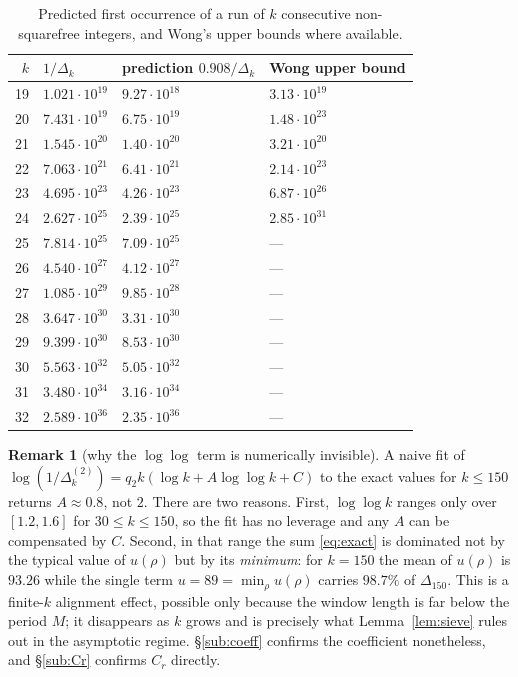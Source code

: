 \documentclass[11pt,reqno]{amsart}
\theoremstyle{plain}
\theoremstyle{definition}
\newtheorem{remark}[theorem]{Remark}
\numberwithin{equation}{section}
\begin{document}
\begin{table}[ht]
\caption{Predicted first occurrence of a run of $k$ consecutive non-squarefree integers,
and Wong's upper bounds where available.}
\label{tab:pred}
\begin{tabular}{rlll}
\toprule
$k$ & $1/\Delta_k$ & prediction $0.908/\Delta_k$ & Wong upper bound\\
\midrule
19 & $1.021\cdot10^{19}$ & $9.27\cdot10^{18}$ & $3.13\cdot10^{19}$\\
20 & $7.431\cdot10^{19}$ & $6.75\cdot10^{19}$ & $1.48\cdot10^{23}$\\
21 & $1.545\cdot10^{20}$ & $1.40\cdot10^{20}$ & $3.21\cdot10^{20}$\\
22 & $7.063\cdot10^{21}$ & $6.41\cdot10^{21}$ & $2.14\cdot10^{23}$\\
23 & $4.695\cdot10^{23}$ & $4.26\cdot10^{23}$ & $6.87\cdot10^{26}$\\
24 & $2.627\cdot10^{25}$ & $2.39\cdot10^{25}$ & $2.85\cdot10^{31}$\\
25 & $7.814\cdot10^{25}$ & $7.09\cdot10^{25}$ & ---\\
26 & $4.540\cdot10^{27}$ & $4.12\cdot10^{27}$ & ---\\
27 & $1.085\cdot10^{29}$ & $9.85\cdot10^{28}$ & ---\\
28 & $3.647\cdot10^{30}$ & $3.31\cdot10^{30}$ & ---\\
29 & $9.399\cdot10^{30}$ & $8.53\cdot10^{30}$ & ---\\
30 & $5.563\cdot10^{32}$ & $5.05\cdot10^{32}$ & ---\\
31 & $3.480\cdot10^{34}$ & $3.16\cdot10^{34}$ & ---\\
32 & $2.589\cdot10^{36}$ & $2.35\cdot10^{36}$ & ---\\
\bottomrule
\end{tabular}
\end{table}

\begin{remark}[why the $\log\log$ term is numerically invisible]\label{rem:slow}
A naive fit of $\log(1/\Delta^{(2)}_k)=q_2k(\log k+A\log\log k+C)$ to the exact values for
$k\le150$ returns $A\approx0.8$, not $2$. There are two reasons. First, $\log\log k$ ranges
only over $[1.2,1.6]$ for $30\le k\le150$, so the fit has no leverage and any $A$ can be
compensated by $C$. Second, in that range the sum \eqref{eq:exact} is dominated not by the
typical value of $u(\rho)$ but by its \emph{minimum}: for $k=150$ the mean of $u(\rho)$ is
$93.26$ while the single term $u=89=\min_\rho u(\rho)$ carries $98.7\%$ of $\Delta_{150}$.
This is a finite-$k$ alignment effect, possible only because the window length is far below
the period $M$; it disappears as $k$ grows and is precisely what Lemma~\ref{lem:sieve}
rules out in the asymptotic regime. \S\ref{sub:coeff} confirms the coefficient nonetheless,
and \S\ref{sub:Cr} confirms $C_r$ directly.
\end{remark}
\end{document}
